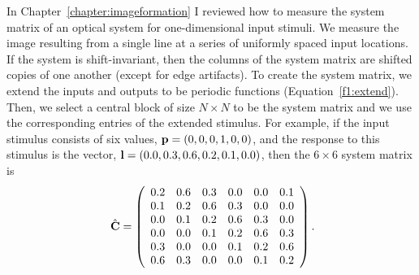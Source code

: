 In Chapter~\ref{chapter:imageformation} I reviewed how to measure the
system matrix of an optical system for one-dimensional input stimuli.
We measure the image resulting from a single line at a series of
uniformly spaced input locations.  If the system is shift-invariant,
then the columns of the system matrix are shifted copies of one
another (except for edge artifacts).  To create the system matrix, we
extend the inputs and outputs to be periodic functions
(Equation~\ref{f1:extend}). Then, we select a central block of size $N
\times N$ to be the system matrix and we use the corresponding entries
of the extended stimulus.  For example, if the input stimulus consists
of six values, $\mbox {$\bf p$} = (0,0,0,1,0,0)$, and the response to this
stimulus is the vector, $\mbox {$\bf l$} = (0.0,0.3,0.6,0.2,0.1,0.0)$, then
the $6 \times 6$ system matrix is
\begin{equation}
\mbox{ $\hat{{\bf C}}$} =
 \left (
 \begin{array}{cccccc}
  0.2 & 0.6 & 0.3 & 0.0 & 0.0 & 0.1 \\
  0.1 & 0.2 & 0.6 & 0.3 & 0.0 & 0.0 \\
  0.0 & 0.1 & 0.2 & 0.6 & 0.3 & 0.0 \\
  0.0 & 0.0 & 0.1 & 0.2 & 0.6 & 0.3 \\
  0.3 & 0.0 & 0.0 & 0.1 & 0.2 & 0.6 \\
  0.6 & 0.3 & 0.0 & 0.0 & 0.1 & 0.2 
 \end{array}
\right) .
\end{equation}

